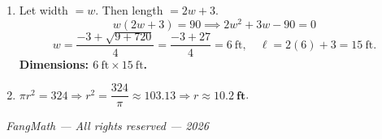 \documentclass[12pt]{article}
\begin{document}
\begin{tcolorbox}[ansbox]
\begin{enumerate}[leftmargin=*, label=\textbf{\arabic*.}, start=28]
  \item Let width $= w$. Then length $= 2w+3$.
        \[
          w(2w+3) = 90 \implies 2w^2+3w-90=0
        \]
        \[
          w = \frac{-3 + \sqrt{9+720}}{4} = \frac{-3+27}{4} = 6\ \text{ft}, \quad
          \ell = 2(6)+3 = 15\ \text{ft}.
        \]
        \textbf{Dimensions: $6\ \text{ft} \times 15\ \text{ft}$.}

  \item $\pi r^2 = 324 \Rightarrow r^2 = \dfrac{324}{\pi} \approx 103.13 \Rightarrow r \approx \mathbf{10.2\ \text{ft}}$.
\end{enumerate}

\end{tcolorbox}

\vfill
\begin{center}
\textit{\textcopyright\ FangMath --- All rights reserved --- 2026}
\end{center}
\end{document}
